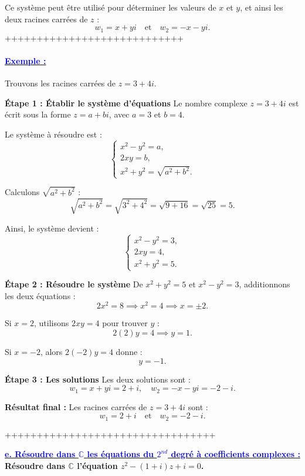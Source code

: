\documentclass[12pt]{article}
\begin{document}
Ce système peut être utilisé pour déterminer les valeurs de \( x \) et \( y \), et ainsi les deux racines carrées de \( z \) :
\[
w_1 = x + yi \quad \text{et} \quad w_2 = -x - yi.
\]
++++++++++++++++++++++++++++
\paragraph{\underline{\textbf{\textcolor{blue}{Exemple :}}}}

Trouvons les racines carrées de \( z = 3 + 4i \).

\textbf{Étape 1 : Établir le système d'équations}  
Le nombre complexe \( z = 3 + 4i \) est écrit sous la forme \( z = a + bi \), avec \( a = 3 \) et \( b = 4 \).  

Le système à résoudre est :
\[
\begin{cases}
x^2 - y^2 = a, \\
2xy = b, \\
x^2 + y^2 = \sqrt{a^2 + b^2}.
\end{cases}
\]

Calculons \( \sqrt{a^2 + b^2} \) :
\[
\sqrt{a^2 + b^2} = \sqrt{3^2 + 4^2} = \sqrt{9 + 16} = \sqrt{25} = 5.
\]

Ainsi, le système devient :
\[
\begin{cases}
x^2 - y^2 = 3, \\
2xy = 4, \\
x^2 + y^2 = 5.
\end{cases}
\]

\textbf{Étape 2 : Résoudre le système}  
De \( x^2 + y^2 = 5 \) et \( x^2 - y^2 = 3 \), additionnons les deux équations :
\[
2x^2 = 8 \implies x^2 = 4 \implies x = \pm 2.
\]

Si \( x = 2 \), utilisons \( 2xy = 4 \) pour trouver \( y \) :
\[
2(2)y = 4 \implies y = 1.
\]

Si \( x = -2 \), alors \( 2(-2)y = 4 \) donne :
\[
y = -1.
\]

\textbf{Étape 3 : Les solutions}  
Les deux solutions sont :
\[
w_1 = x + yi = 2 + i, \quad w_2 = -x - yi = -2 - i.
\]

\textbf{Résultat final :}  
Les racines carrées de \( z = 3 + 4i \) sont :
\[
w_1 = 2 + i \quad \text{et} \quad w_2 = -2 - i.
\]

+++++++++++++++++++++++++++++++++

\underline{\textbf{\textcolor{blue}{e. Résoudre dans $\mathbb{C}$ les équations du $2^{nd}$ degré à coefficients complexes :}}}\\
\textbf{Résoudre dans \( \mathbb{C} \) l’équation \( z^2 - (1 + i)z + i = 0 \).}
\end{document}
